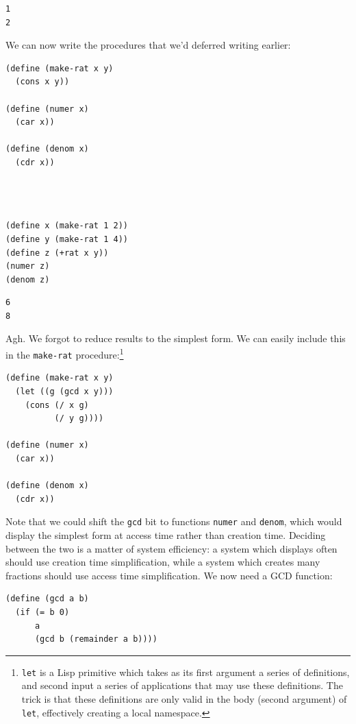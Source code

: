 \documentclass[9pt]{report}
\begin{document}
\begin{verbatim}
1
2
\end{verbatim}


We can now write the procedures that we'd deferred writing
earlier:

\begin{verbatim}
(define (make-rat x y)
  (cons x y))

(define (numer x)
  (car x))

(define (denom x)
  (cdr x))
\end{verbatim}

\begin{verbatim}



(define x (make-rat 1 2))
(define y (make-rat 1 4))
(define z (+rat x y))
(numer z)
(denom z)
\end{verbatim}

\begin{verbatim}
6
8
\end{verbatim}


Agh. We forgot to reduce results to the simplest form. We can
easily include this in the \texttt{make-rat} procedure:\footnote{\texttt{let} is a Lisp primitive which takes as its first argument a
series of definitions, and second input a series of applications that may
use these definitions. The trick is that these definitions are only
valid in the body (second argument) of \texttt{let}, effectively creating a
local namespace.}

\begin{verbatim}
(define (make-rat x y)
  (let ((g (gcd x y)))
    (cons (/ x g)
          (/ y g))))

(define (numer x)
  (car x))

(define (denom x)
  (cdr x))
\end{verbatim}

Note that we could shift the \texttt{gcd} bit to functions \texttt{numer} and
\texttt{denom}, which would display the simplest form at access time
rather than creation time. Deciding between the two is a matter of
system efficiency: a system which displays often should use
creation time simplification, while a system which creates many
fractions should use access time simplification.
We now need a GCD function:

\begin{verbatim}
(define (gcd a b)
  (if (= b 0)
      a
      (gcd b (remainder a b))))
\end{verbatim}
\end{document}
